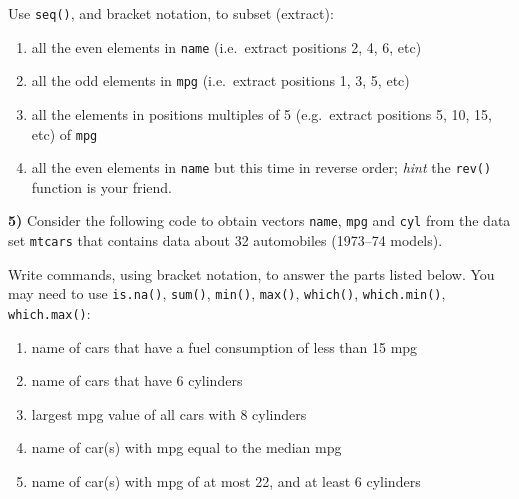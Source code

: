 \documentclass[
]{book}
\newenvironment{Shaded}{\begin{snugshade}}{\end{snugshade}}
\newcommand{\CommentTok}[1]{\textcolor[rgb]{0.56,0.35,0.01}{\textit{#1}}}
\newcommand{\FunctionTok}[1]{\textcolor[rgb]{0.00,0.00,0.00}{#1}}
\newcommand{\NormalTok}[1]{#1}
\newcommand{\OtherTok}[1]{\textcolor[rgb]{0.56,0.35,0.01}{#1}}
\newcommand{\SpecialCharTok}[1]{\textcolor[rgb]{0.00,0.00,0.00}{#1}}
\begin{document}
Use \texttt{seq()}, and bracket notation, to subset (extract):

\begin{enumerate}
\def\labelenumi{\alph{enumi})}
\item
  all the even elements in \texttt{name} (i.e.~extract positions 2, 4, 6, etc)
\item
  all the odd elements in \texttt{mpg} (i.e.~extract positions 1, 3, 5, etc)
\item
  all the elements in positions multiples of 5 (e.g.~extract positions 5, 10,
  15, etc) of \texttt{mpg}
\item
  all the even elements in \texttt{name} but this time in reverse order; \emph{hint} the
  \texttt{rev()} function is your friend.
\end{enumerate}

\textbf{5)} Consider the following code to obtain vectors \texttt{name}, \texttt{mpg} and \texttt{cyl}
from the data set \texttt{mtcars} that contains data about 32 automobiles (1973--74
models).

\begin{Shaded}
\end{Shaded}

Write commands, using bracket notation, to answer the parts listed below.
You may need to use \texttt{is.na()}, \texttt{sum()}, \texttt{min()}, \texttt{max()}, \texttt{which()},
\texttt{which.min()}, \texttt{which.max()}:

\begin{enumerate}
\def\labelenumi{\alph{enumi})}
\item
  name of cars that have a fuel consumption of less than 15 mpg
\item
  name of cars that have 6 cylinders
\item
  largest mpg value of all cars with 8 cylinders
\item
  name of car(s) with mpg equal to the median mpg
\item
  name of car(s) with mpg of at most 22, and at least 6 cylinders
\end{enumerate}
\end{document}
